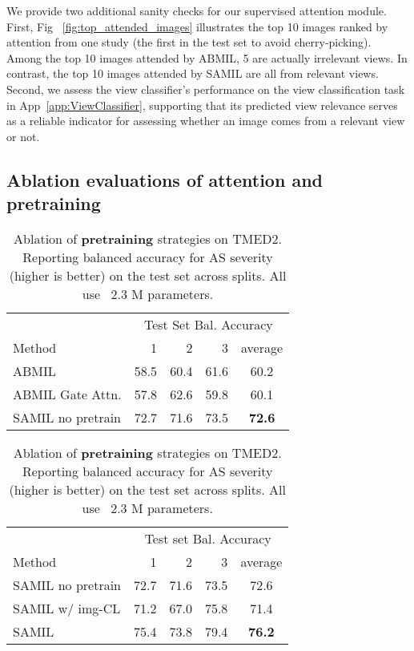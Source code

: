 We provide two additional sanity checks for our supervised attention module. 
First, Fig ~\ref{fig:top_attended_images} illustrates the top 10 images ranked by attention from one study (the first in the test set to avoid cherry-picking).
Among the top 10 images attended by ABMIL, 5 are actually irrelevant views. In contrast, the top 10 images attended by SAMIL are all from relevant views.
Second, we assess the view classifier's performance on the view classification task in App~\ref{app:ViewClassifier}, supporting that its predicted view relevance serves as a reliable indicator for assessing whether an image comes from a relevant view or not.





\subsection{Ablation evaluations of attention and pretraining}

\begin{table}[!h]
\parbox{.45\linewidth}{
\centering
    \begin{tabular}{l|rrr|c}
	    & \multicolumn{4}{c}{Test Set Bal. Accuracy} \\
     Method & 1 & 2 & 3 & average \\
    \hline
    ABMIL             & 58.5 & 60.4 & 61.6 & 60.2 \\
    ABMIL Gate Attn.  & 57.8 & 62.6 & 59.8 & 60.1  \\
    SAMIL no pretrain & 72.7 & 71.6 & 73.5 &\textbf{72.6}
    \end{tabular}
    \caption{Ablation of \textbf{attention} strategies on TMED2. Showing balanced accuracy for AS severity (higher is better) on the test set across splits. All use ~2.3 M parameters.
    }%
    \label{tab:View Regularization ablation}
}%
\hfill 
\parbox{.45\linewidth}{
    \centering
    \begin{tabular}{l|rrr|c}
	          & \multicolumn{4}{c}{Test set Bal. Accuracy} \\
     Method & 1 & 2 & 3 & average \\
    \hline
    
    SAMIL no pretrain & 72.7 & 71.6 & 73.5 & 72.6 \\
    SAMIL w/ img-CL & 71.2 & 67.0 & 75.8 & 71.4 \\
    SAMIL           & 75.4 & 73.8 & 79.4 & \textbf{76.2}
    \end{tabular}
    \caption{Ablation of \textbf{pretraining} strategies on TMED2. Reporting balanced accuracy for AS severity (higher is better) on the test set across splits. All use ~2.3 M parameters.
    }%
    \label{tab:Pretraining strategy ablation}
}%
\end{table}


